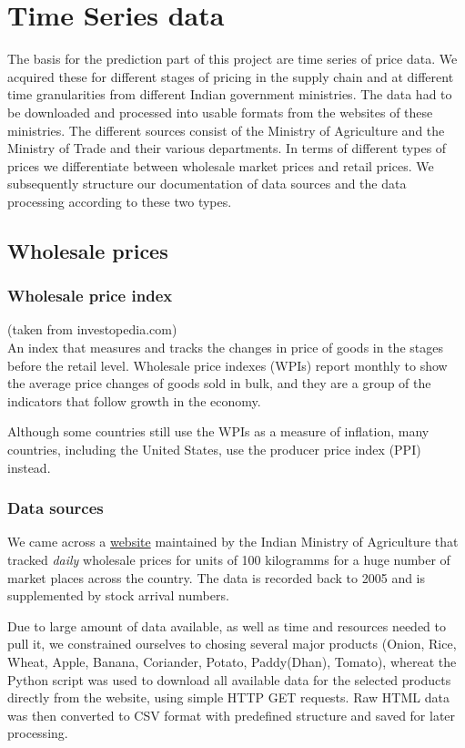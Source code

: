 \section*{Time Series data}
The basis for the prediction part of this project are time series of price data. We acquired these for different stages of pricing in the supply chain and at different time granularities from different Indian government ministries. The data had to be downloaded and processed into usable formats from the websites of these ministries. The different sources consist of the Ministry of Agriculture and the Ministry of Trade and their various departments. In terms of different types of prices we differentiate between wholesale market prices and retail prices. We subsequently structure our documentation of data sources and the data processing according to these two types.

\subsection*{Wholesale prices}

\subsubsection*{Wholesale price index}
(taken from investopedia.com)\\
An index that measures and tracks the changes in price of goods in the stages before the retail level. Wholesale price indexes (WPIs) report monthly to show the average price changes of goods sold in bulk, and they are a group of the indicators that follow growth in the economy.\par
Although some countries still use the WPIs as a measure of inflation, many countries, including the United States, use the producer price index (PPI) instead.\par

\subsubsection*{Data sources}
We came across a \href{http://agmarknet.nic.in/}{website} maintained by the Indian Ministry of Agriculture that tracked \emph{daily} wholesale prices for units of 100 kilogramms for a huge number of market places across the country. The data is recorded back to 2005 and is supplemented by stock arrival numbers.\par
Due to large amount of data available, as well as time and resources needed to pull it, we constrained ourselves to chosing several major products (Onion, Rice, Wheat, Apple, Banana, Coriander, Potato, Paddy(Dhan), Tomato), whereat the Python script was used to download all available data for the selected products directly from the website, using simple HTTP GET requests. Raw HTML data was then converted to CSV format with predefined structure and saved for later processing.

